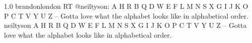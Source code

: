 
{1.0}
{\joinNameTweet
{brandonlondon}
{RT @neiltyson: A H R B Q D W E F L M N S X G I J K O P C T V Y U Z -- Gotta love what the alphabet looks like in alphabetical order.}}
{\joinNameTweet
{neiltyson}
{A H R B Q D W E F L M N S X G I J K O P C T V Y U Z -- Gotta love what the alphabet looks like in alphabetical order.}}
%
%
%
%
%
